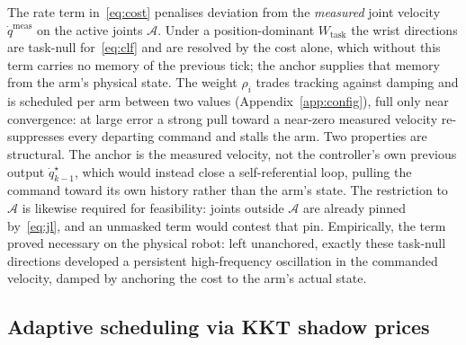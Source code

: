 \documentclass[12pt,a4paper,twoside,openright]{report}
\newcommand{\qdot}{\dot{q}}
\begin{document}
The rate term in~\eqref{eq:cost} penalises deviation from the \emph{measured} joint velocity $\qdot^{\text{meas}}$ on the active joints $\mathcal{A}$. Under a position-dominant $W_{\text{task}}$ the wrist directions are task-null for~\eqref{eq:clf} and are resolved by the cost alone, which without this term carries no memory of the previous tick; the anchor supplies that memory from the arm's physical state. The weight $\rho_i$ trades tracking against damping and is scheduled per arm between two values (Appendix~\ref{app:config}), full only near convergence: at large error a strong pull toward a near-zero measured velocity re-suppresses every departing command and stalls the arm. Two properties are structural. The anchor is the measured velocity, not the controller's own previous output $\qdot^{\star}_{k-1}$, which would instead close a self-referential loop, pulling the command toward its own history rather than the arm's state. The restriction to $\mathcal{A}$ is likewise required for feasibility: joints outside $\mathcal{A}$ are already pinned by~\eqref{eq:jl}, and an unmasked term would contest that pin. Empirically, the term proved necessary on the physical robot: left unanchored, exactly these task-null directions developed a persistent high-frequency oscillation in the commanded velocity, damped by anchoring the cost to the arm's actual state.

\subsection{Adaptive scheduling via KKT shadow prices}
\label{sec:sched}
\end{document}
